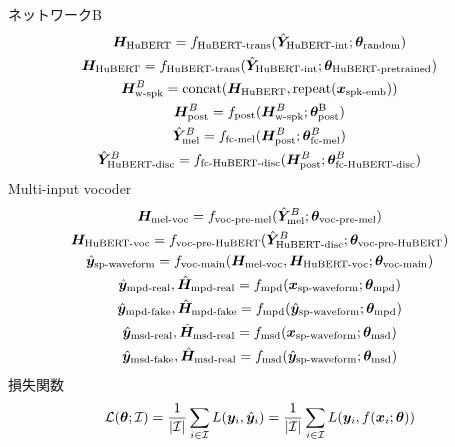 \documentclass[12pt]{jarticle}
\numberwithin{equation}{section}    %
\numberwithin{figure}{section}      %
\numberwithin{table}{section}      %
\begin{document}
ネットワークB
\begin{gather}
    \bm{H}_{\text{HuBERT}} = f_{\text{HuBERT-trans}}(\hat{\bm{Y}}_{\text{HuBERT-int}}; \bm{\theta}_{\text{random}}) \\
    \bm{H}_{\text{HuBERT}} = f_{\text{HuBERT-trans}}(\hat{\bm{Y}}_{\text{HuBERT-int}}; \bm{\theta}_{\text{HuBERT-pretrained}}) \\
    \bm{H}_{\text{w-spk}}^{B} = \text{concat}(\bm{H}_{\text{HuBERT}}, \text{repeat}(\bm{x}_{\text{spk-emb}})) \\
    \bm{H}_{\text{post}}^{B} = f_{\text{post}}(\bm{H}_{\text{w-spk}}^{B}; \bm{\theta}_{\text{post}}^{\text{B}}) \\
    \hat{\bm{Y}}_{\text{mel}}^{B} = f_{\text{fc-mel}}(\bm{H}_{\text{post}}^{B}; \bm{\theta}_{\text{fc-mel}}^{B}) \\
    \hat{\bm{Y}}_{\text{HuBERT-disc}}^{B} = f_{\text{fc-HuBERT-disc}}(\bm{H}_{\text{post}}^{B}; \bm{\theta}_{\text{fc-HuBERT-disc}}^{B})
\end{gather}
Multi-input vocoder
\begin{gather}
    \bm{H}_{\text{mel-voc}} = f_{\text{voc-pre-mel}}(\hat{\bm{Y}}_{\text{mel}}^{B}; \bm{\theta}_{\text{voc-pre-mel}}) \\
    \bm{H}_{\text{HuBERT-voc}} = f_{\text{voc-pre-HuBERT}}(\hat{\bm{Y}}_{\text{HuBERT-disc}}^{B}; \bm{\theta}_{\text{voc-pre-HuBERT}}) \\
    \hat{\bm{y}}_{\text{sp-waveform}} = f_{\text{voc-main}}(\bm{H}_{\text{mel-voc}}, \bm{H}_{\text{HuBERT-voc}}; \bm{\theta}_{\text{voc-main}}) \\
    \hat{\bm{y}}_{\text{mpd-real}}, \hat{\bm{H}}_{\text{mpd-real}}  = f_{\text{mpd}}(\bm{x}_{\text{sp-waveform}}; \bm{\theta}_{\text{mpd}}) \\
    \hat{\bm{y}}_{\text{mpd-fake}}, \hat{\bm{H}}_{\text{mpd-fake}} = f_{\text{mpd}}(\hat{\bm{y}}_{\text{sp-waveform}}; \bm{\theta}_{\text{mpd}}) \\
    \hat{\bm{y}}_{\text{msd-real}}, \hat{\bm{H}}_{\text{msd-real}} = f_{\text{msd}}(\bm{x}_{\text{sp-waveform}}; \bm{\theta}_{\text{msd}}) \\
    \hat{\bm{y}}_{\text{msd-fake}}, \hat{\bm{H}}_{\text{msd-real}} = f_{\text{msd}}(\hat{\bm{y}}_{\text{sp-waveform}}; \bm{\theta}_{\text{msd}})
\end{gather}
損失関数
\begin{gather}
    \mathcal{L}(\bm{\theta}; \mathcal{I}) = \frac{1}{|\mathcal{I}|} \sum_{i \in \mathcal{I}} L(\bm{y}_{i}, \hat{\bm{y}}_{i}) = \frac{1}{|\mathcal{I}|} \sum_{i \in \mathcal{I}} L(\bm{y}_{i}, f(\bm{x}_{i}; \bm{\theta}))
\end{gather}
\end{document}
